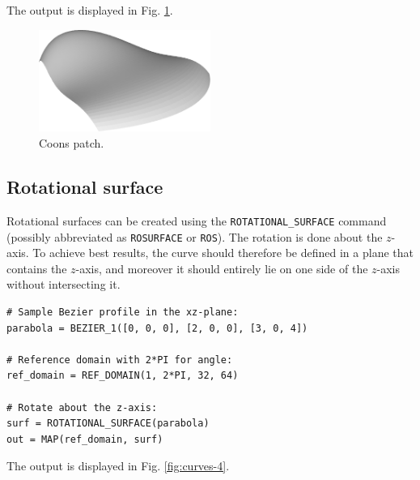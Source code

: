 \noindent
The output is displayed in Fig. \ref{fig:curves-3}.

\begin{figure}[!ht]
\begin{center}
\includegraphics[width=0.5\textwidth]{img/curves-3.png}
\end{center}
\vspace{-4mm}
\caption{Coons patch.}
\label{fig:curves-3}
\end{figure}

\subsection{Rotational surface}

Rotational surfaces can be created using the {\tt ROTATIONAL\_SURFACE} command
(possibly abbreviated as {\tt ROSURFACE} or {\tt ROS}).
The rotation is done about the $z$-axis. To achieve best results, the curve
should therefore be defined in a plane that contains the $z$-axis, and moreover 
it should entirely lie on one side of the $z$-axis without intersecting it.\\

\begin{bbox}
\begin{verbatim}
# Sample Bezier profile in the xz-plane: 
parabola = BEZIER_1([0, 0, 0], [2, 0, 0], [3, 0, 4])
  
# Reference domain with 2*PI for angle:
ref_domain = REF_DOMAIN(1, 2*PI, 32, 64)

# Rotate about the z-axis:
surf = ROTATIONAL_SURFACE(parabola)
out = MAP(ref_domain, surf)
\end{verbatim}
\end{bbox}
\vspace{6mm}

\noindent
The output is displayed in Fig. \ref{fig:curves-4}.\\

